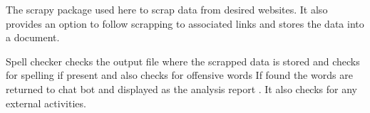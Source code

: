 \documentclass{beamer}
\begin{document}
\begin{frame}
The scrapy package used here to scrap data from desired websites. It also
provides an option to follow scrapping to associated links and stores the data into a
document.
\end{frame}
\begin{frame}
Spell checker checks the output file where the scrapped data is stored and
checks for spelling if present and also checks for offensive words If found the words
are returned to chat bot and displayed as the analysis report . It also checks for any
external activities.

\end{frame}
\end{document}
